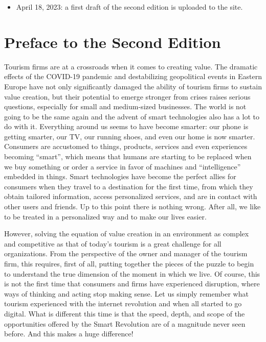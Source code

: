 \documentclass[
  letterpaper,
  DIV=11,
  numbers=noendperiod]{scrreprt}
\providecommand{\tightlist}{%
  \setlength{\itemsep}{0pt}\setlength{\parskip}{0pt}}\usepackage{longtable,booktabs,array}
\begin{document}
\begin{itemize}
\tightlist
\item
  April 18, 2023: a first draft of the second edition is uploaded to the
  site.
\end{itemize}


\hypertarget{preface-to-the-second-edition}{%
\chapter*{Preface to the Second
Edition}\label{preface-to-the-second-edition}}


Tourism firms are at a crossroads when it comes to creating value. The
dramatic effects of the COVID-19 pandemic and destabilizing geopolitical
events in Eastern Europe have not only significantly damaged the ability
of tourism firms to sustain value creation, but their potential to
emerge stronger from crises raises serious questions, especially for
small and medium-sized businesses. The world is not going to be the same
again and the advent of smart technologies also has a lot to do with it.
Everything around us seems to have become smarter: our phone is getting
smarter, our TV, our running shoes, and even our home is now smarter.
Consumers are accustomed to things, products, services and even
experiences becoming ``smart'', which means that humans are starting to
be replaced when we buy something or order a service in favor of
machines and ``intelligence'' embedded in things. Smart technologies
have become the perfect allies for consumers when they travel to a
destination for the first time, from which they obtain tailored
information, access personalized services, and are in contact with other
users and friends. Up to this point there is nothing wrong. After all,
we like to be treated in a personalized way and to make our lives
easier.

However, solving the equation of value creation in an environment as
complex and competitive as that of today's tourism is a great challenge
for all organizations. From the perspective of the owner and manager of
the tourism firm, this requires, first of all, putting together the
pieces of the puzzle to begin to understand the true dimension of the
moment in which we live. Of course, this is not the first time that
consumers and firms have experienced disruption, where ways of thinking
and acting stop making sense. Let us simply remember what tourism
experienced with the internet revolution and when all started to go
digital. What is different this time is that the speed, depth, and scope
of the opportunities offered by the Smart Revolution are of a magnitude
never seen before. And this makes a huge difference!
\end{document}
